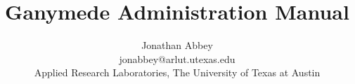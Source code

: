 \title{Ganymede Administration Manual}
\author{Jonathan Abbey\\jonabbey@arlut.utexas.edu\\Applied Research Laboratories, The University of Texas at Austin}

\maketitle
